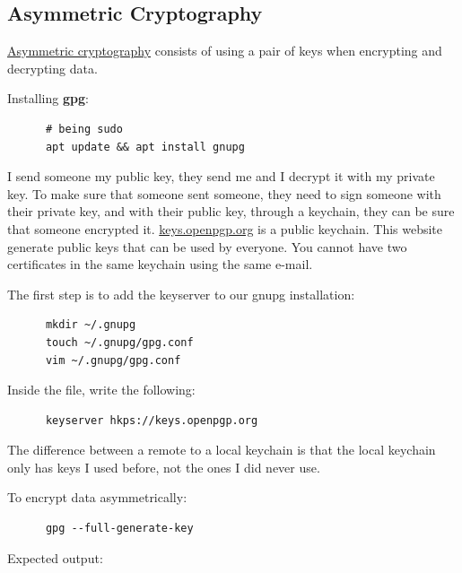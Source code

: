 \documentclass{article}
\begin{document}
\subsection{Asymmetric Cryptography}
\href{https://en.wikipedia.org/wiki/Public-key_cryptography}{Asymmetric cryptography} consists of using a pair of keys when encrypting and decrypting data.

Installing \textbf{gpg}:

\begin{verbatim}
      # being sudo
      apt update && apt install gnupg
\end{verbatim}

I send someone my public key, they send me and I decrypt it with my private key. To make sure that someone sent someone, they need to sign someone with their private key, and with their public key, through a keychain, they can be sure that someone encrypted it. \href{https://keys.openpgp.org/}{keys.openpgp.org} is a public keychain. This website generate public keys that can be used by everyone. You cannot have two certificates in the same keychain using the same e-mail.

The first step is to add the keyserver to our gnupg installation:

\begin{verbatim}
      mkdir ~/.gnupg
      touch ~/.gnupg/gpg.conf
      vim ~/.gnupg/gpg.conf
\end{verbatim}

Inside the file, write the following:

\begin{verbatim}
      keyserver hkps://keys.openpgp.org
\end{verbatim}

The difference between a remote to a local keychain is that the local keychain only has keys I used before, not the ones I did never use.

To encrypt data asymmetrically:

\begin{verbatim}
      gpg --full-generate-key
\end{verbatim}

Expected output:
\end{document}
